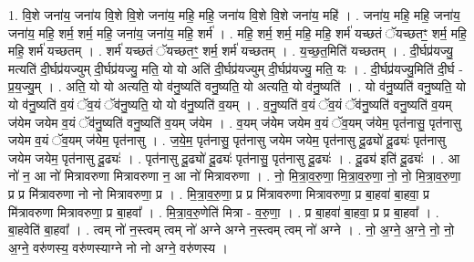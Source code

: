 \documentclass[17pt]{extarticle}
\begin{document}
1. वि॒शे जना॑य॒ जना॑य वि॒शे वि॒शे जना॑य॒ महि॒ महि॒ जना॑य वि॒शे वि॒शे जना॑य॒ महि॑ । . जना॑य॒ महि॒ महि॒ जना॑य॒ जना॑य॒ महि॒ शर्म॒ शर्म॒ महि॒ जना॑य॒ जना॑य॒ महि॒ शर्म॑ । . महि॒ शर्म॒ शर्म॒ महि॒ महि॒ शर्म॑ यच्छतं ॅयच्छतꣳ॒॒ शर्म॒ महि॒ महि॒ शर्म॑ यच्छतम् । . शर्म॑ यच्छतं ॅयच्छतꣳ॒॒ शर्म॒ शर्म॑ यच्छतम् । . य॒च्छ॒त॒मिति॑ यच्छतम् । . दी॒र्घप्र॑यज्यु॒ मत्यति॑ दी॒र्घप्र॑यज्युम् दी॒र्घप्र॑यज्यु॒ मति॒ यो यो अति॑ दी॒र्घप्र॑यज्युम् दी॒र्घप्र॑यज्यु॒ मति॒ यः । . दी॒र्घप्र॑यज्यु॒मिति॑ दी॒र्घ - प्र॒य॒ज्यु॒म् । . अति॒ यो यो अत्यति॒ यो व॑नु॒ष्यति॑ वनु॒ष्यति॒ यो अत्यति॒ यो व॑नु॒ष्यति॑ । . यो व॑नु॒ष्यति॑ वनु॒ष्यति॒ यो यो व॑नु॒ष्यति॑ व॒यं ॅव॒यं ॅव॑नु॒ष्यति॒ यो यो व॑नु॒ष्यति॑ व॒यम् । . व॒नु॒ष्यति॑ व॒यं ॅव॒यं ॅव॑नु॒ष्यति॑ वनु॒ष्यति॑ व॒यम् ज॑येम जयेम व॒यं ॅव॑नु॒ष्यति॑ वनु॒ष्यति॑ व॒यम् ज॑येम । . व॒यम् ज॑येम जयेम व॒यं ॅव॒यम् ज॑येम॒ पृत॑नासु॒ पृत॑नासु जयेम व॒यं ॅव॒यम् ज॑येम॒ पृत॑नासु । . ज॒ये॒म॒ पृत॑नासु॒ पृत॑नासु जयेम जयेम॒ पृत॑नासु दू॒ढ्यो॑ दू॒ढ्यः॑ पृत॑नासु जयेम जयेम॒ पृत॑नासु दू॒ढ्यः॑ । . पृत॑नासु दू॒ढ्यो॑ दू॒ढ्यः॑ पृत॑नासु॒ पृत॑नासु दू॒ढ्यः॑ । . दू॒ढ्य॑ इति॑ दू॒ढ्यः॑ । . आ नो॑ न॒ आ नो॑ मित्रावरुणा मित्रावरुणा न॒ आ नो॑ मित्रावरुणा । . नो॒ मि॒त्रा॒व॒रु॒णा॒ मि॒त्रा॒व॒रु॒णा॒ नो॒ नो॒ मि॒त्रा॒व॒रु॒णा॒ प्र प्र मि॑त्रावरुणा नो नो मित्रावरुणा॒ प्र । . मि॒त्रा॒व॒रु॒णा॒ प्र प्र मि॑त्रावरुणा मित्रावरुणा॒ प्र बा॒हवा॑ बा॒हवा॒ प्र मि॑त्रावरुणा मित्रावरुणा॒ प्र बा॒हवा᳚ । . मि॒त्रा॒व॒रु॒णेति॑ मित्रा - व॒रु॒णा॒ । . प्र बा॒हवा॑ बा॒हवा॒ प्र प्र बा॒हवा᳚ । . बा॒हवेति॑ बा॒हवा᳚ । . त्वम् नो॑ न॒स्त्वम् त्वम् नो॑ अग्ने अग्ने न॒स्त्वम् त्वम् नो॑ अग्ने । . नो॒ अ॒ग्ने॒ अ॒ग्ने॒ नो॒ नो॒ अ॒ग्ने॒ वरु॑णस्य॒ वरु॑णस्याग्ने नो नो अग्ने॒ वरु॑णस्य । \newline
\end{document}
